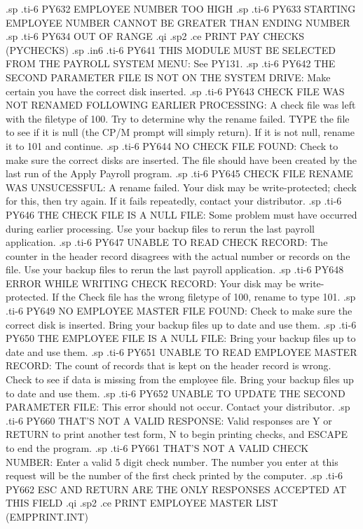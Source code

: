 .sp
.ti-6
PY632 EMPLOYEE NUMBER TOO HIGH
.sp
.ti-6
PY633 STARTING EMPLOYEE NUMBER CANNOT BE GREATER THAN ENDING NUMBER
.sp
.ti-6
PY634 OUT OF RANGE
.qi
.sp2
.ce
PRINT PAY CHECKS (PYCHECKS)
.sp
.in6
.ti-6
PY641 THIS MODULE MUST BE SELECTED FROM THE PAYROLL SYSTEM MENU: See PY131.
.sp
.ti-6
PY642 THE SECOND PARAMETER FILE IS NOT ON THE SYSTEM DRIVE: Make certain
you have the correct disk inserted.
.sp
.ti-6
PY643 CHECK FILE WAS NOT RENAMED FOLLOWING EARLIER PROCESSING:	A check
file was left with the filetype of 100. Try to
determine why the rename failed.  TYPE the file to see if it is null
(the CP/M prompt will simply return).  If it is not null, rename it
to 101 and continue.
.sp
.ti-6
PY644 NO CHECK FILE FOUND: Check to make sure the correct disks are inserted.
The file should have been created by the last run of the Apply Payroll program.
.sp
.ti-6
PY645 CHECK FILE RENAME WAS UNSUCESSFUL:  A rename failed.  Your disk
may be write-protected; check for this, then try again.  If it fails
repeatedly, contact your distributor.
.sp
.ti-6
PY646 THE CHECK FILE IS A NULL FILE: Some problem must have occurred during
earlier processing.  Use your backup files to rerun the last payroll
application.
.sp
.ti-6
PY647 UNABLE TO READ CHECK RECORD:  The counter in the header record disagrees
with the actual number or records on the file.	Use your backup files to
rerun the last payroll application.
.sp
.ti-6
PY648 ERROR WHILE WRITING CHECK RECORD: Your disk may be write-protected.
If the Check file has the wrong filetype of 100, rename to type 101.
.sp
.ti-6
PY649 NO EMPLOYEE MASTER FILE FOUND: Check to make sure the correct disk
is inserted.  Bring your backup files up to date and use them.
.sp
.ti-6
PY650 THE EMPLOYEE FILE IS A NULL FILE: Bring your backup files up to date
and use them.
.sp
.ti-6
PY651 UNABLE TO READ EMPLOYEE MASTER RECORD:  The count of records that is
kept on the header record is wrong.  Check to see if data
is missing from the employee file.  Bring your backup files up to date
and use them.
.sp
.ti-6
PY652 UNABLE TO UPDATE THE SECOND PARAMETER FILE:  This error should not
occur.	Contact your distributor.
.sp
.ti-6
PY660 THAT'S NOT A VALID RESPONSE: Valid responses are Y or RETURN to
print another test form, N to begin printing checks, and ESCAPE to end
the program.
.sp
.ti-6
PY661 THAT'S NOT A VALID CHECK NUMBER: Enter a valid 5 digit check number.
The number you enter at this request will be the number of the first
check printed by the computer.
.sp
.ti-6
PY662 ESC AND RETURN ARE THE ONLY RESPONSES ACCEPTED AT THIS FIELD
.qi
.sp2
.ce
PRINT EMPLOYEE MASTER LIST (EMPPRINT.INT)
